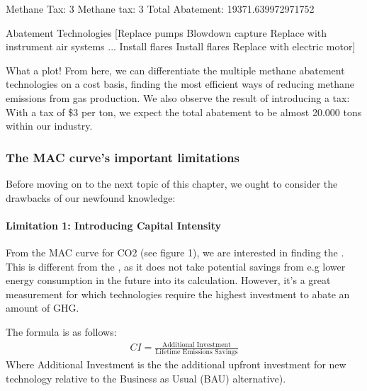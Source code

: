 \documentclass[letterpaper,10pt,english]{jupyterBook}
\begin{document}
\begin{sphinxVerbatim}[commandchars=\\\{\}]
Methane Tax: \PYGZdl{}3
Methane tax:  3
Total Abatement:  19371.639972971752

Abatement Technologies [\PYGZsq{}Replace pumps\PYGZsq{} \PYGZsq{}Blowdown capture\PYGZsq{} \PYGZsq{}Replace with instrument air systems\PYGZsq{}
 ... \PYGZsq{}Install flares\PYGZsq{} \PYGZsq{}Install flares\PYGZsq{} \PYGZsq{}Replace with electric motor\PYGZsq{}]
\end{sphinxVerbatim}

\noindent{}

\noindent{}

\sphinxAtStartPar
What a plot! From here, we can differentiate the multiple methane abatement technologies on a cost basis, finding the most efficient ways of reducing methane emissions from gas production. We also observe the result of introducing a tax: With a tax of \$3 per ton, we expect the total abatement to be almost 20.000 tons within our industry.


\subsubsection{The MAC curve’s important limitations}
\label{\detokenize{content/12-environmental/textbook1:the-mac-curve-s-important-limitations}}
\sphinxAtStartPar
Before moving on to the next topic of this chapter, we ought to consider the drawbacks of our newfound knowledge:


\paragraph{Limitation 1: Introducing Capital Intensity}
\label{\detokenize{content/12-environmental/textbook1:limitation-1-introducing-capital-intensity}}
\sphinxAtStartPar
From the MAC curve for CO2 (see figure 1), we are interested in finding the . This is different from the , as it does not take potential savings from e.g lower energy consumption in the future into its calculation. However, it’s a great measurement for which technologies require the highest  investment to abate an amount of GHG.

\sphinxAtStartPar
The formula is as follows:
\begin{equation*}
\begin{split}CI = \frac{\text{Additional Investment}}{\text{Lifetime Emissions Savings}}\end{split}
\end{equation*}
\sphinxAtStartPar
Where Additional Investment is the the additional upfront investment for new technology relative to the Business as Usual (BAU) alternative).
\end{document}
